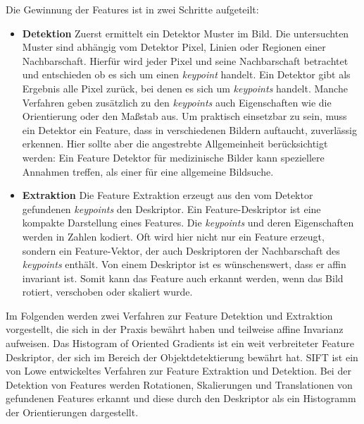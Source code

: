 Die Gewinnung der Features ist in zwei Schritte aufgeteilt: 
\begin{itemize}
	\item \textbf{Detektion} Zuerst ermittelt ein Detektor Muster im Bild. Die untersuchten Muster sind abhängig vom Detektor Pixel, Linien oder Regionen einer Nachbarschaft. Hierfür wird jeder Pixel und seine Nachbarschaft betrachtet und entschieden ob es sich um einen \textit{keypoint} handelt. Ein Detektor gibt als Ergebnis alle Pixel zurück, bei denen es sich um \textit{keypoints} handelt. Manche Verfahren geben zusätzlich zu den \textit{keypoints} auch Eigenschaften wie die Orientierung oder den Maßstab aus. Um praktisch einsetzbar zu sein, muss ein Detektor ein Feature, dass in verschiedenen Bildern auftaucht, zuverlässig erkennen. Hier sollte aber die angestrebte Allgemeinheit berücksichtigt werden: Ein Feature Detektor für medizinische Bilder kann speziellere Annahmen treffen, als einer für eine allgemeine Bildsuche.
	\item \textbf{Extraktion} Die Feature Extraktion erzeugt aus den vom Detektor gefundenen \textit{keypoints} den Deskriptor. Ein Feature-Deskriptor ist eine kompakte Darstellung eines Features. Die \textit{keypoints} und deren Eigenschaften werden in Zahlen kodiert. Oft wird hier nicht nur ein Feature erzeugt, sondern ein Feature-Vektor, der auch Deskriptoren der Nachbarschaft des \textit{keypoints} enthält. Von einem Deskriptor ist es wünschenswert, dass er affin invariant ist. Somit kann das Feature auch erkannt werden, wenn das Bild rotiert, verschoben oder skaliert wurde. 
\end{itemize}

Im Folgenden werden zwei Verfahren zur Feature Detektion und Extraktion vorgestellt, die sich in der Praxis bewährt haben und teilweise affine Invarianz aufweisen. Das Histogram of Oriented Gradients ist ein weit verbreiteter Feature Deskriptor, der sich im Bereich der Objektdetektierung bewährt hat. SIFT ist ein von Lowe \cite{dif2004} entwickeltes Verfahren zur Feature Extraktion und Detektion. Bei der Detektion von Features werden Rotationen, Skalierungen und Translationen von gefundenen Features erkannt und diese durch den Deskriptor als ein Histogramm der Orientierungen dargestellt.\cite{ifd2016}

